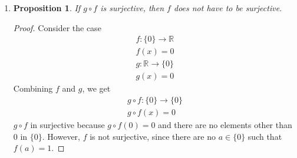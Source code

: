 \documentclass{article}
\newtheorem{prop}[thm]{Proposition}
\begin{document}
\begin{enumerate}
\begin{enumerate}
\begin{proof}
        Consider the case  
        \begin{gather}
            f: \mathbb{R}_{\geq0} \rightarrow \mathbb{R} \\
            f(x) = x \\
            g: \mathbb{R} \rightarrow \mathbb{R}_{\geq0} \\
            g(x) = x^2
        \end{gather}
        Combining $f$ and $g$, we get
        \begin{gather}
            g \circ f: \mathbb{R}_{\geq0} \rightarrow \mathbb{R}_{\geq0} \\
            g \circ f(x) = x^2
        \end{gather}
        We will first show that $g \circ f$ is injective. \\
        Let $a, b$ be some non-negative real numbers. Suppose that  $g \circ f(a) = g \circ f(b)$. We will show that $a = b$.  \\
        
        Since $g \circ f(a) = a^2$, $g \circ f(b) = b^2$,
        \begin{gather}
            a, b \geq 0 \\
            a^2 = b^2 \\
            a = b 
        \end{gather}
        Therefore, $g \circ f(b)$ is injective. 
        However, $g$ is not injective, as both $g(-1)$ and $g(1)$ equals to 1, and $-1, 1 \in \mathbb{R}$. \\
        
        Therefore, $g$ does not have to be injective.
    \end{proof}
    
    \item \begin{prop}
        If $g \circ f$ is surjective, then $f$ does not have to be surjective.
    \end{prop}
    \begin{proof}
        Consider the case  
        \begin{gather}
            f: \{0\} \rightarrow \mathbb{R} \\
            f(x) = 0 \\
            g: \mathbb{R} \rightarrow \{0\} \\
            g(x) = 0
        \end{gather}
        Combining $f$ and $g$, we get
        \begin{gather}
            g \circ f: \{0\} \rightarrow \{0\} \\
            g \circ f(x) = 0
        \end{gather}
        $g \circ f$ in surjective because $g \circ f(0) = 0$ and there are no elements other than 0 in $\{0\}$. However, $f$ is not surjective, since there are no $a \in \{0\}$ such that $f(a) = 1$.
        

\end{proof}
\end{enumerate}
\end{enumerate}
\end{document}
